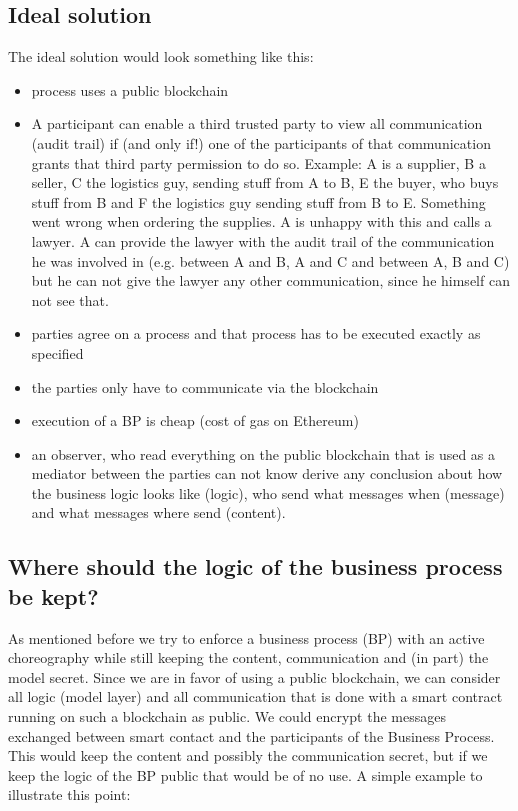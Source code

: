\documentclass[runningheads]{llncs}
\begin{document}
\subsection{Ideal solution}
The ideal solution would look something like this: 
\begin{itemize}
    \item process uses a public blockchain
    \item A participant can enable a third trusted party to view all communication (audit trail) if (and only if!) one of the participants of that communication grants that third party permission to do so. Example: A is a supplier, B a seller, C the logistics guy, sending stuff from A to B, E the buyer, who buys stuff from B and F the logistics guy sending stuff from B to E. Something went wrong when ordering the supplies. A is unhappy with this and calls a lawyer. A can provide the lawyer with the audit trail of the communication he was involved in (e.g. between A and B, A and C and between A, B and C) but he can not give the lawyer any other communication, since he himself can not see that.
    \item parties agree on a process and that process has to be executed exactly as specified
    \item the parties only have to communicate via the blockchain
    \item execution of a BP is cheap (cost of gas on Ethereum)
    \item an observer, who read everything on the public blockchain that is used as a mediator between the parties can not know derive any conclusion about how the business logic looks like (logic), who send what messages when (message) and what messages where send (content).
\end{itemize}


\subsection{Where should the logic of the business process be kept?}

As mentioned before we try to enforce a business process (BP) with an active choreography while still keeping the content, communication and (in part) the model secret. Since we are in favor of using a public blockchain, we can consider all logic (model layer) and all communication that is done with a smart contract running on such a blockchain as public. We could encrypt the messages exchanged between smart contact and the participants of the Business Process. This would keep the content and possibly the communication secret, but if we keep the logic of the BP public that would be of no use. A simple example to illustrate this point:
\end{document}
